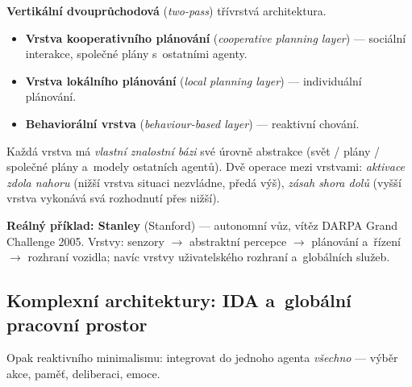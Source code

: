 \documentclass[11pt,a4paper]{article}
\theoremstyle{definition}
\begin{document}
\begin{defbox}
\textbf{Vertikální dvouprůchodová} (\emph{two-pass}) třívrstvá architektura.
\begin{itemize}
\item \textbf{Vrstva kooperativního plánování} (\emph{cooperative planning layer}) ---
  sociální interakce, společné plány s~ostatními agenty.
\item \textbf{Vrstva lokálního plánování} (\emph{local planning layer}) --- individuální
  plánování.
\item \textbf{Behaviorální vrstva} (\emph{behaviour-based layer}) --- reaktivní chování.
\end{itemize}
Každá vrstva má \emph{vlastní znalostní bázi} své úrovně abstrakce (svět / plány / společné
plány a~modely ostatních agentů). Dvě operace mezi vrstvami: \emph{aktivace zdola nahoru}
(nižší vrstva situaci nezvládne, předá výš), \emph{zásah shora dolů} (vyšší vrstva vykonává
svá rozhodnutí přes nižší).
\end{defbox}

\medskip
\noindent\textbf{Reálný příklad: Stanley} (Stanford) --- autonomní vůz, vítěz DARPA Grand
Challenge 2005. Vrstvy: senzory $\to$ abstraktní percepce $\to$ plánování a~řízení
$\to$ rozhraní vozidla; navíc vrstvy uživatelského rozhraní a~globálních služeb.

\subsection{Komplexní architektury: IDA a~globální pracovní prostor}
\label{ssec:ida}

Opak reaktivního minimalismu: integrovat do jednoho agenta \emph{všechno} --- výběr akce,
paměť, deliberaci, emoce.
\end{document}
